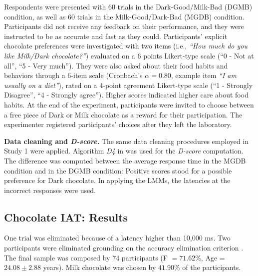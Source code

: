 \documentclass[12pt]{book}
\begin{document}
Respondents were presented with 60 trials in the Dark-Good/Milk-Bad (DGMB) condition, as well as 60 trials in the Milk-Good/Dark-Bad (MGDB) condition. Participants did not receive any feedback on their performance, and they were instructed to be as accurate and fast as they could.
Participants' explicit chocolate preferences were investigated with two items (i.e., \textit{``How much do you like Milk/Dark chocolate?''}) evaluated on a 6 points Likert-type scale (``0 - Not at all'', ``5 - Very much''). They were also asked about their food habits and behaviors through a 6-item scale (Cronbach's $\alpha = 0.80$, example item \textit{``I am usually on a diet''}), rated on a 4-point agreement Likert-type scale (``1 - Strongly Disagree'', ``4 - Strongly agree''). Higher scores indicated higher care about food habits. 
At the end of the experiment, participants were invited to choose between a free piece of Dark or Milk chocolate as a reward for their participation. The experimenter registered participants' choices after they left the laboratory.

\textbf{Data cleaning and \emph{D-score}.}
The same data cleaning procedures employed in Study 1 were applied. Algorithm \emph{D4} in  was used for the \emph{D-score} computation. The difference was computed between the average response time in the MGDB condition and in the DGMB condition: Positive scores stood for a possible preference for Dark chocolate. In applying the LMMs, the latencies at the incorrect responses were used. 

\subsection{Chocolate IAT: Results}
One trial was eliminated because of a latency higher than 10,000 ms. Two participants were eliminated grounding on the accuracy elimination criterion \cite{Nosek2002}. The final sample was composed by 74 participants  (F $=71.62$\%, Age = $24.08 \pm2.88$ years). Milk chocolate was chosen by $41.90$\% of the participants.
\end{document}
